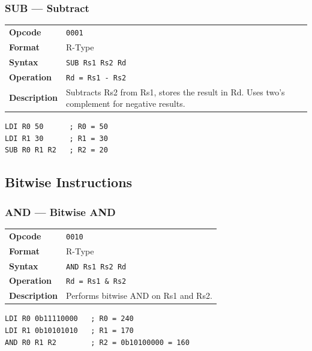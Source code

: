 \documentclass[11pt,a4paper]{article}
\newcommand{\opcode}[1]{\texttt{#1}}
\begin{document}
\subsubsection{SUB --- Subtract}

\begin{table}[H]
\begin{tabularx}{\textwidth}{@{}lX@{}}
\toprule
\textbf{Opcode}      & \opcode{0001} \\
\textbf{Format}      & R-Type \\
\textbf{Syntax}      & \lstinline|SUB Rs1 Rs2 Rd| \\
\textbf{Operation}   & \texttt{Rd = Rs1 - Rs2} \\
\textbf{Description} & Subtracts Rs2 from Rs1, stores the result in Rd. Uses two's complement for negative results. \\
\bottomrule
\end{tabularx}
\end{table}

\begin{lstlisting}
LDI R0 50      ; R0 = 50
LDI R1 30      ; R1 = 30
SUB R0 R1 R2   ; R2 = 20
\end{lstlisting}

\subsection{Bitwise Instructions}

\subsubsection{AND --- Bitwise AND}

\begin{table}[H]
\begin{tabularx}{\textwidth}{@{}lX@{}}
\toprule
\textbf{Opcode}      & \opcode{0010} \\
\textbf{Format}      & R-Type \\
\textbf{Syntax}      & \lstinline|AND Rs1 Rs2 Rd| \\
\textbf{Operation}   & \texttt{Rd = Rs1 \& Rs2} \\
\textbf{Description} & Performs bitwise AND on Rs1 and Rs2. \\
\bottomrule
\end{tabularx}
\end{table}

\begin{lstlisting}
LDI R0 0b11110000   ; R0 = 240
LDI R1 0b10101010   ; R1 = 170
AND R0 R1 R2        ; R2 = 0b10100000 = 160
\end{lstlisting}
\end{document}
